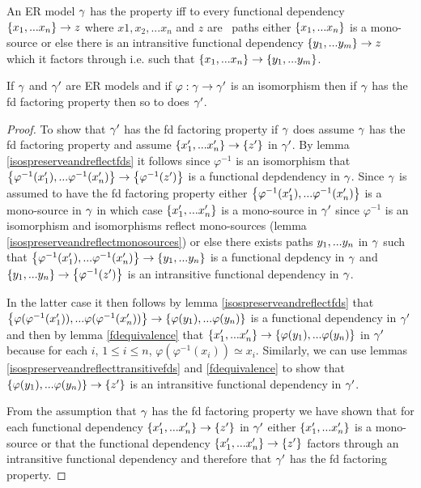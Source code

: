\begin{definition}
\noindent An ER model $\gamma$ has the \term{\fdfactoring} property iff to every functional dependency $\left\{x_1,...x_n\right\} \rightarrow z$ where $x1, x_2, ... x_n$ and $z$ are \attributelike\ paths either $\left\{x_1,...x_n\right\}$ is
a mono-source or else there is an intransitive functional dependency $\left\{y_1,...y_m\right\} \rightarrow z$ which it factors through i.e. such that $\left\{x_1,...x_n\right\} \rightarrow \left\{y_1,...y_m\right\}$.
\end{definition}

\begin{lemma}
If $\gamma$ and $\gamma'$ are ER models and if $\varphi:\gamma \rightarrow \gamma'$ is an isomorphism
then if $\gamma$ has the fd factoring property then so to does $\gamma'$.
\end{lemma}
\begin{proof}
To show that $\gamma'$ has the fd factoring property if $\gamma$ does assume $\gamma$ has the fd factoring property and assume $\left\{x'_1,...x'_n\right\} \rightarrow \left\{z'\right\}$ in $\gamma'$. 
By lemma \ref{isospreserveandreflectfds} it follows since $\varphi^{-1}$ is an isomorphism that $\left\{\varphi^{-1}(x'_1),...\varphi^{-1}(x'_n)\right\} \rightarrow \left\{\varphi^{-1}(z')\right\}$ is a functional depdendency
in $\gamma$. Since $\gamma$ is assumed to have the fd factoring property either $\left\{\varphi^{-1}(x'_1),...\varphi^{-1}(x'_n)\right\}$ is a mono-source in $\gamma$ in which case $\left\{x'_1,...x'_n\right\}$ is a mono-source in 
$\gamma'$ since $\varphi^{-1}$ is an isomorphism  and isomorphisms reflect mono-sources (lemma \ref{isospreserveandreflectmonosources}) or else there exists paths $y_1,...y_n$ in $\gamma$ such that
$\left\{\varphi^{-1}(x'_1),...\varphi^{-1}(x'_n)\right\} \rightarrow \left\{y_1,...y_n\right\}$ is a functional depdency in $\gamma$ and 
 $\left\{y_1,...y_n\right\} \rightarrow \left\{\varphi^{-1}(z')\right\}$ is an intransitive functional dependency in $\gamma$.  

In the latter case it then follows by lemma
\ref{isospreserveandreflectfds} that
 $\left\{\varphi(\varphi^{-1}(x'_1)),...\varphi(\varphi^{-1}(x'_n))\right\} \rightarrow \left\{\varphi(y_1),...\varphi(y_n)\right\}$
is a functional dependency in $\gamma'$
and then by lemma \ref{fdequivalence}  that $\left\{x'_1,...x'_n\right\} \rightarrow \left\{\varphi(y_1),...\varphi(y_n)\right\}$ in $\gamma'$
because for each $i$, $1 \leq i \leq n$, $\varphi(\varphi^{-1}(x_i)) \simeq x_i$.
Similarly, we can use lemmas \ref{isospreserveandreflecttransitivefds} and \ref{fdequivalence} to show that $\left\{\varphi(y_1),...\varphi(y_n)\right\} \rightarrow \left\{z'\right\}$ is an intransitive functional dependency in $\gamma'$. 

From the assumption that $\gamma$ has the fd factoring property we have shown that for each functional dependency $\left\{x'_1,...x'_n\right\} \rightarrow \left\{z'\right\}$ in $\gamma'$ either $\left\{x'_1,...x'_n\right\}$ is a mono-source  or
that the functional dependency  $\left\{x'_1,...x'_n\right\} \rightarrow \left\{z'\right\}$ factors through an intransitive functional dependency and  therefore that $\gamma'$ has the fd factoring property.
\end{proof}


